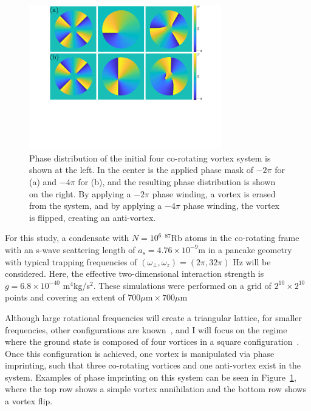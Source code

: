 \begin{figure}
\center \includegraphics[width=0.75\textwidth]{data/2d/phase/phase}

\caption{
Phase distribution of the initial four co-rotating vortex system is shown at the left.
In the center is the applied phase mask of $-2\pi$ for (a) and $-4\pi$ for (b), and the resulting phase distribution is shown on the right.
By applying a $-2\pi$ phase winding, a vortex is erased from the system, and by applying a $-4\pi$ phase winding, the vortex is flipped, creating an anti-vortex.
}
\label{fig:phase}
\end{figure}

For this study, a condensate with $N = 10^6$ $^{87}$Rb atoms in the co-rotating frame with an s-wave scattering length of $a_s=4.76\times 10^{-9}$m in a pancake geometry with typical trapping frequencies of $(\omega_\perp, \omega_z) = (2\pi, 32\pi)$ Hz will be considered.
Here, the effective two-dimensional interaction strength is $g = 6.8\times 10^{-40}$ m$^4$kg/s$^2$.
These simulations were performed on a grid of $2^{10} \times 2^{10}$ points and covering an extent of $700\mu \text{m} \times 700 \mu \text{m}$

Although large rotational frequencies will create a triangular lattice, for smaller frequencies, other configurations are known~\cite{aftalion2001}, and I will focus on the regime where the ground state is composed of four vortices in a square configuration~\cite{zampetaki2013}.
Once this configuration is achieved, one vortex is manipulated via phase imprinting, such that three co-rotating vortices and one anti-vortex exist in the system.
Examples of phase imprinting on this system can be seen in Figure~\ref{fig:phase}, where the top row shows a simple vortex annihilation and the bottom row shows a vortex flip.

